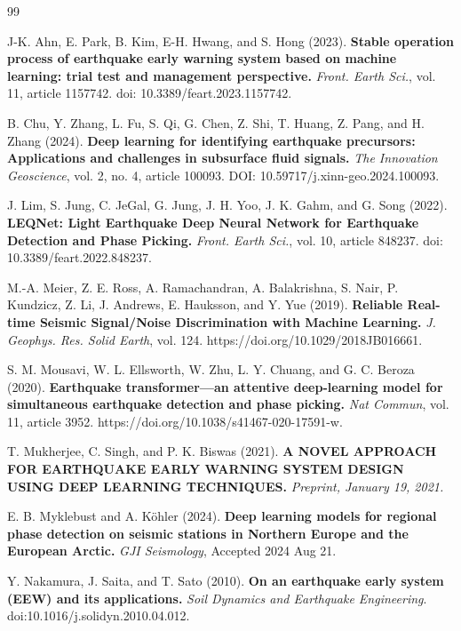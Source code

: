 \documentclass[a4paper,12pt]{report}
\begin{document}
\begin{thebibliography}{99}


J-K. Ahn, E. Park, B. Kim, E-H. Hwang, and S. Hong (2023). \textbf{Stable operation process of earthquake early warning system based on machine learning: trial test and management perspective.} \textit{Front. Earth Sci.}, vol. 11, article 1157742. doi: 10.3389/feart.2023.1157742.


B. Chu, Y. Zhang, L. Fu, S. Qi, G. Chen, Z. Shi, T. Huang, Z. Pang, and H. Zhang (2024). \textbf{Deep learning for identifying earthquake precursors: Applications and challenges in subsurface fluid signals.} \textit{The Innovation Geoscience}, vol. 2, no. 4, article 100093. DOI: 10.59717/j.xinn-geo.2024.100093.


J. Lim, S. Jung, C. JeGal, G. Jung, J. H. Yoo, J. K. Gahm, and G. Song (2022). \textbf{LEQNet: Light Earthquake Deep Neural Network for Earthquake Detection and Phase Picking.} \textit{Front. Earth Sci.}, vol. 10, article 848237. doi: 10.3389/feart.2022.848237.


M.-A. Meier, Z. E. Ross, A. Ramachandran, A. Balakrishna, S. Nair, P. Kundzicz, Z. Li, J. Andrews, E. Hauksson, and Y. Yue (2019). \textbf{Reliable Real-time Seismic Signal/Noise Discrimination with Machine Learning.} \textit{J. Geophys. Res. Solid Earth}, vol. 124. https://doi.org/10.1029/2018JB016661.


S. M. Mousavi, W. L. Ellsworth, W. Zhu, L. Y. Chuang, and G. C. Beroza (2020). \textbf{Earthquake transformer—an attentive deep-learning model for simultaneous earthquake detection and phase picking.} \textit{Nat Commun}, vol. 11, article 3952. https://doi.org/10.1038/s41467-020-17591-w.


T. Mukherjee, C. Singh, and P. K. Biswas (2021). \textbf{A NOVEL APPROACH FOR EARTHQUAKE EARLY WARNING SYSTEM DESIGN USING DEEP LEARNING TECHNIQUES.} \textit{Preprint, January 19, 2021.}


E. B. Myklebust and A. Köhler (2024). \textbf{Deep learning models for regional phase detection on seismic stations in Northern Europe and the European Arctic.} \textit{GJI Seismology}, Accepted 2024 Aug 21.


Y. Nakamura, J. Saita, and T. Sato (2010). \textbf{On an earthquake early system (EEW) and its applications.} \textit{Soil Dynamics and Earthquake Engineering}. doi:10.1016/j.solidyn.2010.04.012.



\end{thebibliography}
\end{document}
